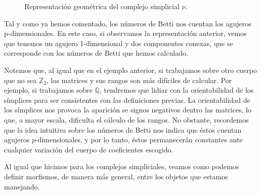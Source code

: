 \documentclass[12pt, a4paper, twoside]{book}
\numberwithin{equation}{section}
\theoremstyle{definition}
\newenvironment{ejem}
  {\pushQED{\qed}\renewcommand{\qedsymbol}{$\blacktriangleleft$}\ejemplo}
  {\popQED\endejemplo}
\theoremstyle{remark}
\theoremstyle{plain}
\begin{document}
\begin{ejem}
		\begin{figure}[!htbp]
			\centering
			\caption{Representación geométrica del complejo simplicial {\Large $\nu$}.}
			\label{fig:homs}
		\end{figure}
		
		Tal y como ya hemos comentado, los números de Betti nos 
		cuentan los agujeros p-dimensionales. En este caso, si 
		observamos la representación anterior, vemos que tenemos un 
		agujero 1-dimensional y dos componentes conexas, que se 
		corresponde con los números de Betti que hemos calculado. 

		Notemos que, al igual que en el ejemplo anterior, si 
		trabajamos sobre otro cuerpo que no sea $\mathbb{Z}_{2}$, las 
		matrices y sus rangos son más difíciles de calcular. Por 
		ejemplo, si trabajamos sobre $\mathbb{Q}$, tendremos que 
		lidiar con la orientabilidad de los símplices para ser 
		consistentes con las definiciones previas. La orientabilidad 
		de los símplices nos provoca la aparición se signos negativos 
		dentro las matrices, lo que, a mayor escala, dificulta el 
		cálculo de los rangos. No obstante, recordemos que la idea 
		intuitiva sobre los números de Betti nos indica que éstos 
		cuentan agujeros $p$-dimensionales, y por lo tanto, éstos 
		permanecerán constantes ante cualquier variación del 
		cuerpo de coeficientes escogido.  
	\end{ejem}
	
	Al igual que hicimos para los complejos simpliciales, veamos como 
	podemos definir morfismos, de manera más general, entre los objetos 
	que estamos manejando.
	
\end{document}
